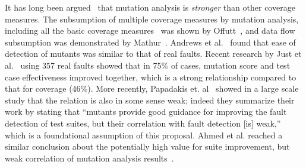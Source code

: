 It has long been argued~\cite{budd1980mutation} that mutation analysis is \emph{stronger}
than other coverage measures. The subsumption of multiple coverage
measures by mutation analysis, including all the basic coverage measures~\cite{myer1979art}
was shown by Offutt~\cite{offutt1996subsumption}, and data flow
subsumption was demonstrated by Mathur~\cite{mathur1994empirical}.
Andrews et al.~\cite{andrews2005mutation,andrews2006using} found that ease of detection
of mutants was similar to that of real faults.
Recent research by Just et al.~\cite{just2014mutants} using 357 real faults
showed that in 75\% of cases, mutation score and test case
effectiveness improved together, which is a strong relationship
compared to that for coverage (46\%).  More recently,
Papadakis et. al~\cite{papadakis2018mutation} showed in a large scale study that the relation is also in some sense weak; indeed
they summarize their work by stating that ``mutants provide good guidance for improving the
fault detection of test suites, but their correlation with fault
detection [is] weak,'' which is a foundational assumption of this
proposal.  Ahmed et al. reached a similar
conclusion about the potentially high value for suite improvement, but weak correlation of mutation
analysis results~\cite{ahmed_testedness}.

